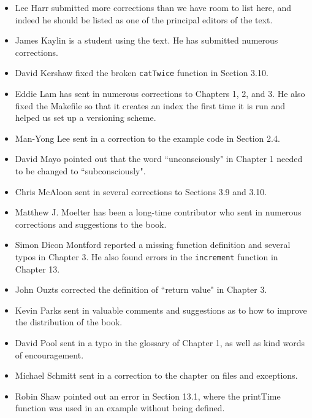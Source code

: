 \documentclass[10pt]{book}
\begin{document}
\begin{CJK}{UTF8}{gbsn}
\begin{itemize}
\item Lee Harr submitted more corrections than we have room to list
here, and indeed he should be listed as one of the principal editors
of the text.

\item James Kaylin is a student using the text. He has submitted
numerous corrections.

\item David Kershaw fixed the broken {\tt catTwice} function in Section
3.10.

\item Eddie Lam has sent in numerous corrections to Chapters 
1, 2, and 3.
He also fixed the Makefile so that it creates an index the first time it is
run and helped us set up a versioning scheme.  

\item Man-Yong Lee sent in a correction to the example code in
Section 2.4.  

\item David Mayo pointed out that the word ``unconsciously"
in Chapter 1 needed
to be changed to ``subconsciously".

\item Chris McAloon sent in several corrections to Sections 3.9 and
3.10.

\item Matthew J. Moelter has been a long-time contributor who sent
in numerous corrections and suggestions to the book.  

\item Simon Dicon Montford reported a missing function definition and
several typos in Chapter 3.  He also found errors in the {\tt increment}
function in Chapter 13.

\item John Ouzts corrected the definition of ``return value"
in Chapter 3.

\item Kevin Parks sent in valuable comments and suggestions as to how
to improve the distribution of the book.

\item David Pool sent in a typo in the glossary of Chapter 1, as well
as kind words of encouragement.

\item Michael Schmitt sent in a correction to the chapter on files
and exceptions.

\item Robin Shaw pointed out an error in Section 13.1, where the
printTime function was used in an example without being defined.


\end{itemize}
\end{CJK}
\end{document}
